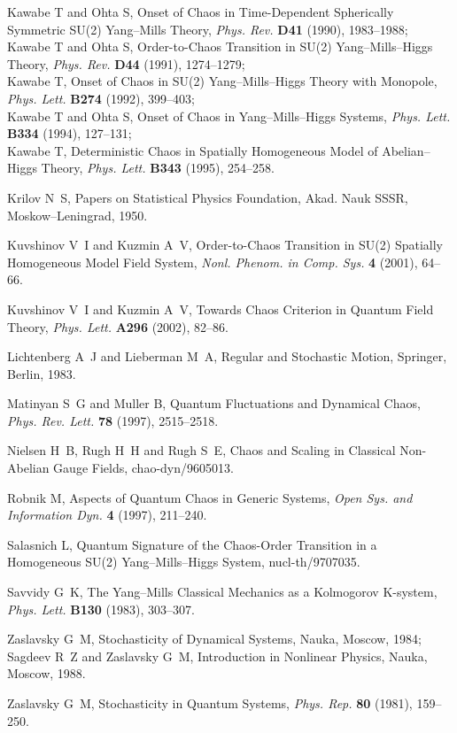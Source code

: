 \documentclass[a4paper,12pt]{article}
\begin{document}
\begin{thebibliography}{99}
 Kawabe T and Ohta S, Onset of Chaos in Time-Dependent Spherically
Symmetric SU(2) Yang--Mills Theory, {\it Phys. Rev.} {\bf D41} (1990), 1983--1988;\\
Kawabe T and Ohta S, Order-to-Chaos Transition in SU(2) Yang--Mills--Higgs Theory,
{\it
Phys. Rev.} {\bf D44} (1991), 1274--1279;\\
 Kawabe T, Onset of Chaos in SU(2) Yang--Mills--Higgs Theory with Monopole, {\it Phys.
Lett.} {\bf B274} (1992), 399--403;\\
 Kawabe T and Ohta S, Onset of Chaos in Yang--Mills--Higgs Systems, {\it Phys. Lett.}
{\bf B334} (1994), 127--131;\\
Kawabe T, Deterministic Chaos in Spatially Homogeneous Model of Abelian--Higgs Theory,
{\it Phys. Lett.} {\bf B343} (1995), 254--258.

 Krilov N~S, Papers on Statistical Physics Foundation, Akad. Nauk
SSSR, Moskow--Leningrad, 1950.

 Kuvshinov V~I and  Kuzmin A~V, Order-to-Chaos Transition in SU(2)
Spatially Homogeneous Model Field System, {\it Nonl. Phenom. in Comp. Sys.} {\bf 4}
(2001), 64--66.

 Kuvshinov V~I and  Kuzmin A~V, Towards Chaos Criterion in Quantum Field
Theory, {\it Phys. Lett.} {\bf A296} (2002), 82--86.

 Lichtenberg A~J and Lieberman M~A, Regular and Stochastic Motion,
Springer, Berlin, 1983.

 Matinyan S~G and Muller B, Quantum Fluctuations and Dynamical Chaos,
{\it Phys. Rev. Lett.} {\bf 78} (1997), 2515--2518.

 Nielsen H~B, Rugh H~H and Rugh S~E, Chaos and Scaling in Classical
Non-Abelian Gauge Fields, chao-dyn/9605013.

Robnik M, Aspects of Quantum Chaos in Generic Systems, {\it Open Sys. and Information
Dyn.} {\bf 4} (1997), 211--240.

 Salasnich L, Quantum Signature of the Chaos-Order Transition in a
Homogeneous SU(2) Yang--Mills--Higgs System, nucl-th/9707035.

 Savvidy G~K, The Yang--Mills Classical Mechanics as a Kolmogorov
K-system, {\it Phys. Lett.}  {\bf B130} (1983), 303--307.

Zaslavsky G~M, Stochasticity of Dynamical Systems, Nauka, Moscow, 1984;\\
Sagdeev R~Z and Zaslavsky G~M, Introduction in Nonlinear Physics, Nauka, Moscow, 1988.

 Zaslavsky G~M, Stochasticity in Quantum Systems, {\it Phys. Rep.} {\bf 80}
(1981), 159--250.
\end{thebibliography}\label{kuvshinov-lastpage}
\end{document}
